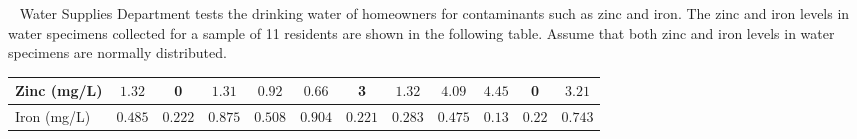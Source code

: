 \documentclass[letterpaper,10pt,addpoints]{exam}
\begin{document}
\begin{questions}
% 
  


\question[30]~
Water Supplies Department tests the drinking water of homeowners for contaminants such as zinc and iron. The zinc and iron levels in water specimens collected for a sample of 11 residents are shown in the following table. Assume that both zinc and iron levels in water specimens are normally distributed.

\begin{tabular}{|l|c|c|c|c|c|c|c|c|c|c|c|}
\hline Zinc (mg/L) & $1.32$ & 0 & $1.31$ & $0.92$ & $0.66$ & 3 & $1.32$ & $4.09$ & $4.45$ & 0 & $3.21$ \\
\hline Iron (mg/L) & $0.485$ & $0.222$ & $0.875$ & $0.508$ & $0.904$ & $0.221$ & $0.283$ & $0.475$ & $0.13$ & $0.22$ & $0.743$ \\
\hline
\end{tabular}
\end{questions}
\end{document}
